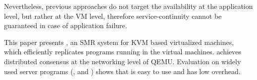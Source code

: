 
Nevertheless, previous approaches do not target the availability at the application 
level, but rather at the VM level, therefore service-continuity cannot be 
guaranteed in case of application failure.

This paper presents \xxx, an SMR system for KVM based virtualized machines, 
which efficiently replicates programs running in the virtual machines. 
\xxx achieves distributed consensus at the networking level of QEMU. 
Evaluation on \nprog widely used server programs (\eg, \mysql and \redis) shows 
that \xxx is easy to use and has low overhead.
